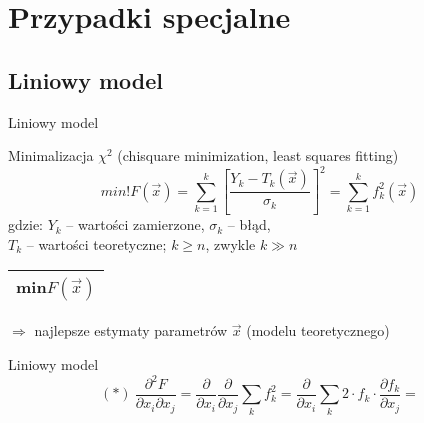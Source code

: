 \section{Przypadki specjalne}

\subsection{Liniowy model}
  \begin{frame}{Liniowy model}
    \begin{block}{Minimalizacja $\chi^{2}$ (chisquare minimization, least squares fitting)}
      \begin{displaymath}
        min!F(\vec{x}) = \sum_{k=1}^{k} \left[ \frac{Y_{k} - T_{k}(\vec{x})}{\sigma_{k}} \right]^{2} = \sum_{k=1}^{k} f_{k}^{2}(\vec{x})
      \end{displaymath}
      gdzie: $Y_{k}$ -- wartości zamierzone, $\sigma_{k}$ -- błąd,\\
      $T_{k}$ -- wartości teoretyczne; $k \geq n$, zwykle $k \gg n$ \\
      \begin{tabular}{|c|} \hline
        min$F(\vec{x})$ \\ \hline
      \end{tabular}
      $\Rightarrow$ najlepsze estymaty parametrów $\vec{x}$
      (modelu teoretycznego)
    \end{block}

  \end{frame}

  \begin{frame}{Liniowy model}
    \begin{displaymath}
      (*)\ \frac{\partial^2 F}{\partial x_{i} \partial x_{j}} =
      \frac{\partial}{\partial x_{i}} \frac{\partial}{\partial x_{j}}
      \sum_{k} f_{k}^2 = \frac{\partial}{\partial x_{i}}
      \sum_{k} 2 \cdot f_{k} \cdot \frac{\partial f_{k}}{\partial x_{j}} =
    \end{displaymath}
  \end{frame}
